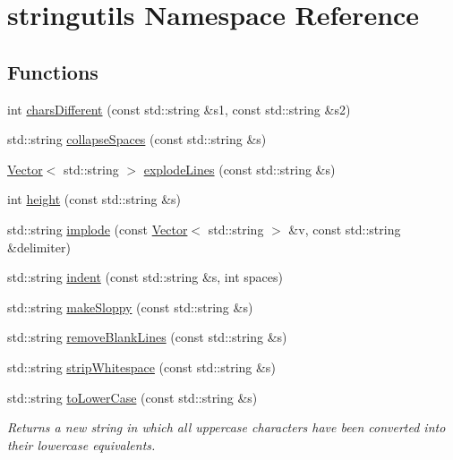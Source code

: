 \hypertarget{namespacestringutils}{}\section{stringutils Namespace Reference}
\label{namespacestringutils}
\subsection*{Functions}
\begin{DoxyCompactItemize}
\item 
int \mbox{\hyperlink{namespacestringutils_a3c38f7cde8e6340eb0ff2ae3820a2806}{chars\+Different}} (const std\+::string \&s1, const std\+::string \&s2)
\item 
std\+::string \mbox{\hyperlink{namespacestringutils_a38bb0a6bb1ecac04f607fb3cfb08cbca}{collapse\+Spaces}} (const std\+::string \&s)
\item 
\mbox{\hyperlink{classVector}{Vector}}$<$ std\+::string $>$ \mbox{\hyperlink{namespacestringutils_aadc9cdd19d79b42a72aa8694260b8675}{explode\+Lines}} (const std\+::string \&s)
\item 
int \mbox{\hyperlink{namespacestringutils_a777c9bd90569d1f9d2dc464a69ea45bd}{height}} (const std\+::string \&s)
\item 
std\+::string \mbox{\hyperlink{namespacestringutils_aa5ab45ed04eb980650e067e108733541}{implode}} (const \mbox{\hyperlink{classVector}{Vector}}$<$ std\+::string $>$ \&v, const std\+::string \&delimiter)
\item 
std\+::string \mbox{\hyperlink{namespacestringutils_afa26297e6041901fc89ea21f251c5bd3}{indent}} (const std\+::string \&s, int spaces)
\item 
std\+::string \mbox{\hyperlink{namespacestringutils_a3f3b01bff686e3495c275bcb492ec4d6}{make\+Sloppy}} (const std\+::string \&s)
\item 
std\+::string \mbox{\hyperlink{namespacestringutils_a65dad9d06071c45572573015f34e6841}{remove\+Blank\+Lines}} (const std\+::string \&s)
\item 
std\+::string \mbox{\hyperlink{namespacestringutils_a76709c55b9e0bcea3f17b9abc8962ae7}{strip\+Whitespace}} (const std\+::string \&s)
\item 
std\+::string \mbox{\hyperlink{namespacestringutils_a55769baf0b588c5d12813228a2e00389}{to\+Lower\+Case}} (const std\+::string \&s)
\begin{DoxyCompactList}\small\item\em Returns a new string in which all uppercase characters have been converted into their lowercase equivalents. \end{DoxyCompactList}\item 

\end{DoxyCompactItemize}
